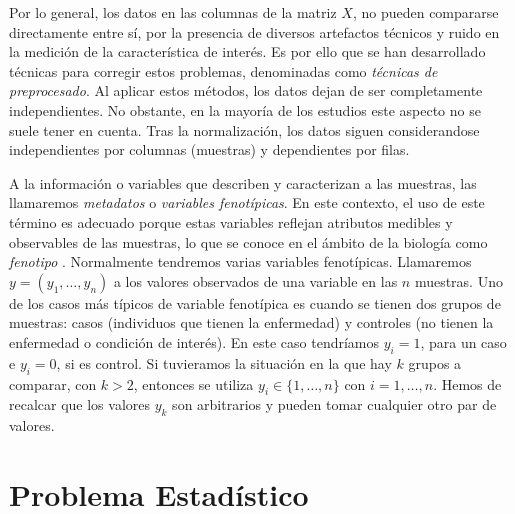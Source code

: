 Por lo general, los datos en las columnas de la matriz $X$, no pueden compararse directamente entre sí, por la presencia
de diversos artefactos técnicos y ruido en la medición de la característica de interés. Es por ello que se han desarrollado
técnicas para corregir estos problemas, denominadas como \textit{técnicas de preprocesado}. Al aplicar estos métodos, los
datos dejan de ser completamente independientes. No obstante, en la mayoría de los estudios este aspecto no se suele
tener en cuenta. Tras la normalización, los datos siguen considerandose independientes por columnas (muestras) y dependientes
por filas. \newline

A la información o variables que describen y caracterizan a las muestras, las llamaremos \textit{metadatos} o 
\textit{variables fenotípicas}. En este contexto, el uso de este término es adecuado porque estas variables reflejan
atributos medibles y observables de las muestras, lo que se conoce en el ámbito de la biología como \textit{fenotipo} \cite{phenotype-definition}. 
Normalmente tendremos varias variables fenotípicas. 
Llamaremos $y = (y_{1},\dots,y_{n})$ a los valores observados de una variable en las $n$ muestras. Uno de los casos más típicos
de variable fenotípica es cuando se tienen dos grupos de muestras: casos (individuos que tienen la enfermedad) y controles
(no tienen la enfermedad o condición de interés). En este caso tendríamos $y_{i} = 1$, para un caso e $y_{i} = 0$, si es control.
Si tuvieramos la situación en la que hay $k$ grupos a comparar, con $k > 2$, entonces se utiliza $y_{i} \in \{1,\dots,n\}$ 
con $i = 1,\dots,n$. Hemos de recalcar que los valores $y_{k}$ son arbitrarios y pueden tomar cualquier otro par de valores.\newline




\section{Problema Estadístico}


